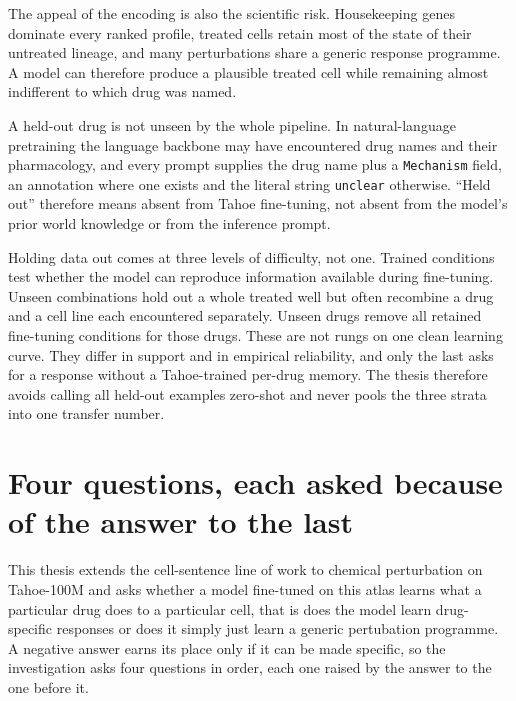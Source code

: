 The appeal of the encoding is also the scientific risk. Housekeeping genes
dominate every ranked profile, treated cells retain most of the state of their
untreated lineage, and many perturbations share a generic response programme. A
model can therefore produce a plausible treated cell while remaining almost
indifferent to which drug was named.

\begin{scopelimit}
A held-out drug is not unseen by the whole pipeline. In natural-language
pretraining the language backbone may have encountered drug names and their
pharmacology, and every prompt supplies the drug name plus a \texttt{Mechanism}
field, an annotation where one exists and the literal string \texttt{unclear}
otherwise.
``Held out'' therefore means absent from Tahoe fine-tuning, not absent from the
model's prior world knowledge or from the inference prompt.
\end{scopelimit}

Holding data out comes at three levels of difficulty, not one. Trained
conditions test whether the model can reproduce information available during
fine-tuning. Unseen combinations hold out a whole treated well but often
recombine a drug and a cell line each encountered separately. Unseen drugs
remove all retained fine-tuning conditions for those drugs. These are not rungs
on one clean learning curve. They differ in support and in empirical
reliability, and only the last asks for a response without a Tahoe-trained
per-drug memory. The thesis therefore avoids calling all held-out examples
zero-shot and never pools the three strata into one transfer number.

\section{Four questions, each asked because of the answer to the last}
\label{sec:intro-map}

This thesis extends the cell-sentence line of work to chemical perturbation on
Tahoe-100M and asks whether a model fine-tuned on this atlas learns what a
particular drug does to a particular cell, that is does the model learn drug-specific responses or does it simply just learn a generic pertubation programme. A negative answer earns its place
only if it can be made specific, so the investigation asks four questions in
order, each one raised by the answer to the one before it.

